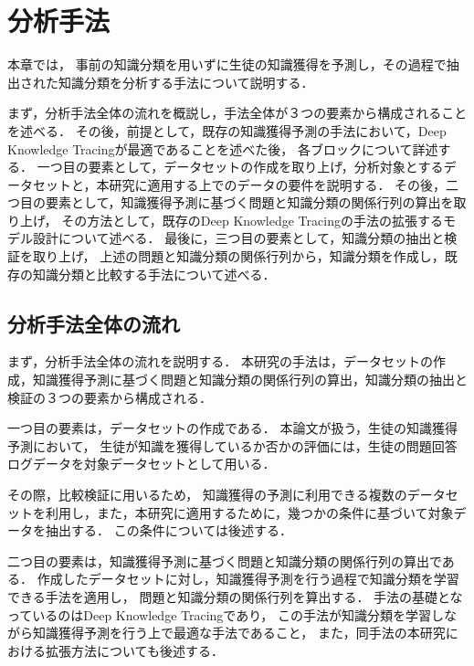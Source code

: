 \chapter{分析手法}
\label{chap:method}
\fancyhf{}
\rhead{\thepage}
\cfoot{\thepage}
本章では，
事前の知識分類を用いずに生徒の知識獲得を予測し，その過程で抽出された知識分類を分析する手法について説明する．

まず，分析手法全体の流れを概説し，手法全体が３つの要素から構成されることを述べる．
その後，前提として，既存の知識獲得予測の手法において，Deep Knowledge Tracingが最適であることを述べた後，
各ブロックについて詳述する．
一つ目の要素として，データセットの作成を取り上げ，分析対象とするデータセットと，本研究に適用する上でのデータの要件を説明する．
その後，二つ目の要素として，知識獲得予測に基づく問題と知識分類の関係行列の算出を取り上げ，
その方法として，既存のDeep Knowledge Tracingの手法の拡張するモデル設計について述べる．
最後に，三つ目の要素として，知識分類の抽出と検証を取り上げ，
上述の問題と知識分類の関係行列から，知識分類を作成し，既存の知識分類と比較する手法について述べる．



\vvspace


\section{分析手法全体の流れ}
まず，分析手法全体の流れを説明する．
本研究の手法は，データセットの作成，知識獲得予測に基づく問題と知識分類の関係行列の算出，知識分類の抽出と検証の３つの要素から構成される．


一つ目の要素は，データセットの作成である．
本論文が扱う，生徒の知識獲得予測において，
生徒が知識を獲得しているか否かの評価には，生徒の問題回答ログデータを対象データセットとして用いる．

その際，比較検証に用いるため，
知識獲得の予測に利用できる複数のデータセットを利用し，また，本研究に適用するために，幾つかの条件に基づいて対象データを抽出する．
この条件については後述する．


二つ目の要素は，知識獲得予測に基づく問題と知識分類の関係行列の算出である．
作成したデータセットに対し，知識獲得予測を行う過程で知識分類を学習できる手法を適用し，
問題と知識分類の関係行列を算出する．
手法の基礎となっているのはDeep Knowledge Tracingであり，
この手法が知識分類を学習しながら知識獲得予測を行う上で最適な手法であること，
また，同手法の本研究における拡張方法についても後述する．



